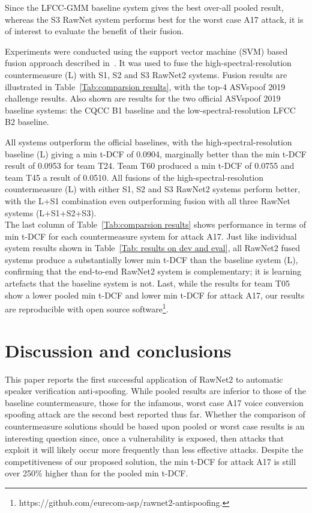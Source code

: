 \documentclass{article}
\begin{document}
Since the LFCC-GMM baseline system gives the best over-all pooled result, whereas the S3 RawNet system performs best for the worst case A17 attack, it is of interest to evaluate the benefit of their fusion.

Experiments were conducted using the support vector machine (SVM) based fusion approach described in~\cite{IS2020LFCC}. It was used to fuse the high-spectral-resolution countermeasure (L) with S1, S2 and S3 RawNet2 systems. Fusion results are illustrated in Table~\ref{Tab:comparsion results}, with the top-4 ASVspoof 2019 challenge results.
Also shown are results for the two official ASVspoof 2019 baseline systems: the CQCC B1 baseline and the low-spectral-resolution LFCC B2 baseline.  




All systems outperform the official baselines, with the high-spectral-resolution baseline (L) giving a min t-DCF of 0.0904, marginally better than the min t-DCF result of 0.0953 for team T24. Team T60 produced a min t-DCF of 0.0755 and team T45 a result of 0.0510. All fusions of the high-spectral-resolution countermeasure (L) with either S1, S2 and S3 RawNet2 systems perform better, with the L+S1 combination even outperforming fusion with all three RawNet systems (L+S1+S2+S3). \\

The last column of Table~\ref{Tab:comparsion results} shows performance in terms of min t-DCF for each countermeasure system for attack A17. Just like individual system results shown in Table~\ref{Tab: results on dev and eval}, all RawNet2 fused systems produce a substantially lower min t-DCF than the baseline system (L), confirming that the end-to-end RawNet2 system is complementary; it is learning artefacts that the baseline system is not. 
Last, while the results for team T05 show a lower pooled min t-DCF and lower min t-DCF for attack A17, our results are reproducible with open source software\footnote{https://github.com/eurecom-asp/rawnet2-antispoofing.}.


\section{Discussion and conclusions}
\label{sec:Conclusion}

This paper reports the first successful application of RawNet2 to automatic speaker verification anti-spoofing. While pooled results are inferior to those of the baseline countermeasure, those for the infamous, worst case A17 voice conversion spoofing attack are the second best reported thus far. Whether the comparison of countermeasure solutions should be based upon pooled or worst case results is an interesting question since, once a vulnerability is exposed, then attacks that exploit it will likely occur more frequently than less effective attacks. Despite the competitiveness of our proposed solution, the min t-DCF for attack A17 is still over 250\% higher than for the pooled min t-DCF.
\end{document}
